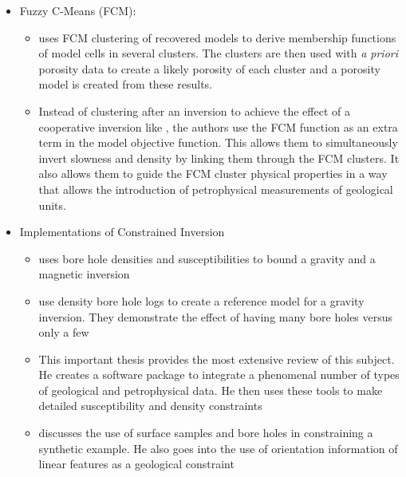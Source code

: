 \begin{itemize}
\item Fuzzy C-Means (FCM): 
\begin{itemize}
	\item \cite{paasche2006integration} uses FCM clustering of recovered models to derive membership functions of model cells in several clusters. The clusters are then used with \emph{a priori} porosity data to create a likely porosity of each cluster and a porosity model is created from these results.
	\item \cite{sun2015multidomain} Instead of clustering after an inversion to achieve the effect of a cooperative inversion like \cite{paasche2006integration}, the authors use the FCM function as an extra term in the model objective function. This allows them to simultaneously invert slowness and density by linking them through the FCM clusters. It also allows them to guide the FCM cluster physical properties in a way that allows the introduction of petrophysical measurements of geological units.
\end{itemize}
\item Implementations of Constrained Inversion
\begin{itemize}
	\item \cite{phillips2001thesis} uses bore hole densities and susceptibilities to bound a gravity and a magnetic inversion	
	\item \cite{farquharson2008geologically} use density bore hole logs to create a reference model for a gravity inversion. They demonstrate  the effect of having many bore holes versus only a few
	\item \cite{williams2008geologically} This important thesis provides the most extensive review of this subject. He creates a software package to integrate a phenomenal number of types of geological and petrophysical data. He then uses these tools to make detailed susceptibility and density constraints
	\item \cite{Lelievre2009Integrating} discusses the use of surface samples and bore holes in constraining a synthetic example. He also goes into the use of orientation information of linear features as a geological constraint
	
	

\end{itemize}
\end{itemize}





\endinput

 Interestingly, the assumption that all magnetizations are in the same direction also assumes that all Koenigsberger ratios are equal.

Any text after an \endinput is ignored.
You could put scraps here or things in progress.
